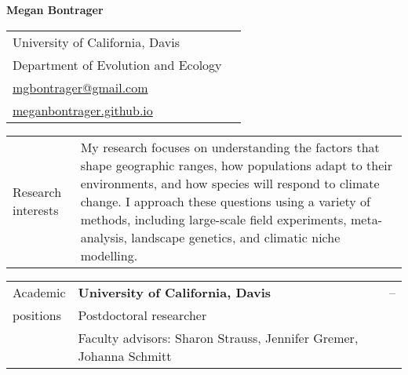 \documentclass[letterpaper,11pt,oneside]{article}
\begin{document}



\noindent  \LARGE{\textbf{Megan Bontrager}} 

\normalsize

\bigskip

\noindent \begin{tabular}{@{} p{8cm} >{\raggedleft\arraybackslash}p{8.11cm}}
University of California, Davis & \\
Department of Evolution and Ecology & \\
{\href{mailto:mgbontrager@gmail.com}{mgbontrager@gmail.com}} & \\
{\href{https://meganbontrager.github.io}{meganbontrager.github.io}} & \\

\end{tabular}
\vspace{1em}


\noindent\hrulefill 

\bigskip
\bigskip



\noindent \begin{tabular}{@{} p{3cm} p{13.11cm}}
\Large{Research interests} & My research focuses on understanding the factors that shape geographic ranges, how populations adapt to their environments, and how species will respond to climate change. I approach these questions using a variety of methods, including large-scale field experiments, meta-analysis, landscape genetics, and climatic niche modelling. \\
\end{tabular}
\bigskip



\noindent \begin{tabular}{@{} p{3cm} p{10.91cm} >{\raggedleft\arraybackslash}p{1.7cm}}
\Large{Academic}    & \textbf{University of California, Davis} & 2018--\hspace*{0.8cm} \\
\Large{positions}   & Postdoctoral researcher & \\
& \raggedright{Faculty advisors: Sharon Strauss, Jennifer Gremer, Johanna Schmitt} & \\
\end{tabular}
\bigskip


\end{document}
